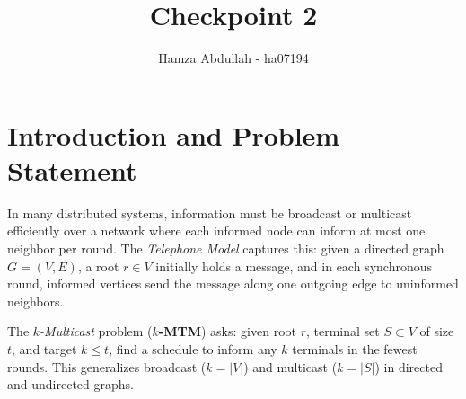 \documentclass[12pt]{article}
\title{Checkpoint 2}
\author{Hamza Abdullah - ha07194}
\date{}
\begin{document}
\maketitle

\section{Introduction and Problem Statement}
In many distributed systems, information must be broadcast or multicast efficiently over a network where each informed node can inform at most one neighbor per round. The \emph{Telephone Model} captures this: given a directed graph $G=(V,E)$, a root $r\in V$ initially holds a message, and in each synchronous round, informed vertices send the message along one outgoing edge to uninformed neighbors.  

The \emph{$k$-Multicast} problem (\textbf{$k$-MTM}) asks: given root $r$, terminal set $S\subset V$ of size $t$, and target $k\le t$, find a schedule to inform any $k$ terminals in the fewest rounds. This generalizes broadcast ($k=|V|$) and multicast ($k=|S|$) in directed and undirected graphs.
\end{document}
